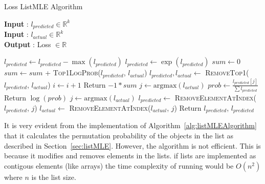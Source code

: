 \documentclass[12pt, twoside, ngerman]{report}
\begin{document}
\begin{algorithm}[h]
\caption{Loss ListMLE Algorithm}
\label{alg:listMLEAlgorithm}
\hspace*{\algorithmicindent} \textbf{Input} : $l_{predicted} \in \mathbb{R}^k$ \\
\hspace*{\algorithmicindent} \textbf{Input} : $l_{actual} \in \mathbb{R}^k$ \\
\hspace*{\algorithmicindent} \textbf{Output} : Loss $\in \mathbb{R}$
\begin{algorithmic}[1]
    \State $l_{predicted} \gets l_{predicted} - \max(l_{predicted})$
    \State $l_{predicted} \gets \exp(l_{predicted})$
    \State $sum \gets 0$
     
        \State $sum \gets sum$ + \textsc{Top1LogProb}($l_{predicted}$,  $l_{actual}$)
        \State $l_{predicted},  l_{actual} \gets $ \textsc{RemoveTop1}($l_{predicted}$,  $l_{actual}$)
        \State $i \gets i + 1$
    \EndFor
    \State  Return $-1 * sum$
    \EndProcedure
    \State $j \gets \textrm{argmax}(l_{actual})$
    \State $prob \gets \frac{l_{predicted}[j]}{\sum l_{predicted} }$
    \State  Return $\log(prob)$
    \EndProcedure
    \State $j \gets \textrm{argmax}(l_{actual})$
    \State $l_{predicted} \gets$ \textsc{RemoveElementAtIndex}($l_{predicted}$, $j$)
    \State $l_{actual} \gets$ \textsc{RemoveElementAtIndex}($l_{actual}$, $j$)
    \State  Return $l_{predicted}$,  $l_{predicted}$
    \EndProcedure
\end{algorithmic}
\end{algorithm}

It is very evident from the implementation of Algorithm~\ref{alg:listMLEAlgorithm} that it calculates the permutation probability of the objects in the list as described in Section~\ref{sec:listMLE}.
However,  the algorithm is not efficient.
This is because it modifies and removes elements in the lists.
if lists are implemented as contigous elements (like arrays) the time complexity of running would be $O(n^2)$ where $n$ is the list size.
\end{document}
